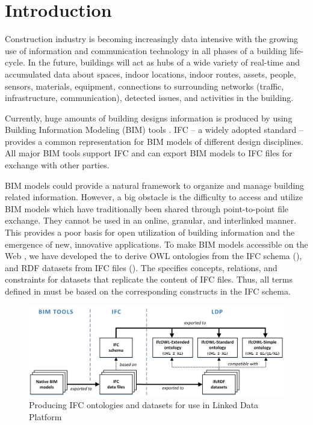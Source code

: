 \section{Introduction}
\label{sec:introduction}

Construction industry is becoming increasingly data intensive with the growing use of
information and communication technology in all phases of a building life-cycle. 
In the future, buildings will act as hubs of a wide variety of real-time and accumulated data about
spaces, indoor locations, indoor routes, assets, people, sensors, materials, equipment, connections
to surrounding networks (traffic, infrastructure, communication), detected issues, and 
activities in the building.

Currently, huge amounts of building designs information is produced by 
using Building Information Modeling (BIM) tools \cite{eastman2011bim}. 
IFC \cite{ISO16739,liebich2010unveiling} -- a widely adopted standard -- provides a common representation for BIM models of 
different design disciplines. All major BIM tools support IFC and can export BIM models to IFC files for exchange with other parties.

BIM models could provide a natural framework to organize and manage building related information. However, a big obstacle is the difficulty to access and utilize BIM models which have traditionally been shared through point-to-point file exchange. They cannot be used in an online, granular, and 
interlinked manner. This provides a poor basis for open utilization of building information and the 
emergence of new, innovative applications.
To make BIM models accessible on the Web \cite{torma2014wobd}, we have developed the 
 to 
derive OWL ontologies from the IFC schema (\ifcowl{}), and RDF datasets from IFC files 
(\ifcrdf{}). The \ifcowl{} specifies concepts, relations, and constraints for \ifcrdf{} datasets that replicate the content of IFC files. 
Thus, all terms defined in \ifcowl{}  must be based on the corresponding constructs in 
the IFC schema. 

\begin{figure}[h]
\centering
\includegraphics{images/ifcOWL-multilayers-6.png}
\caption{Producing IFC ontologies and datasets for use in Linked Data Platform}
\label{fig:ifcOWL-layers}
\end{figure}

